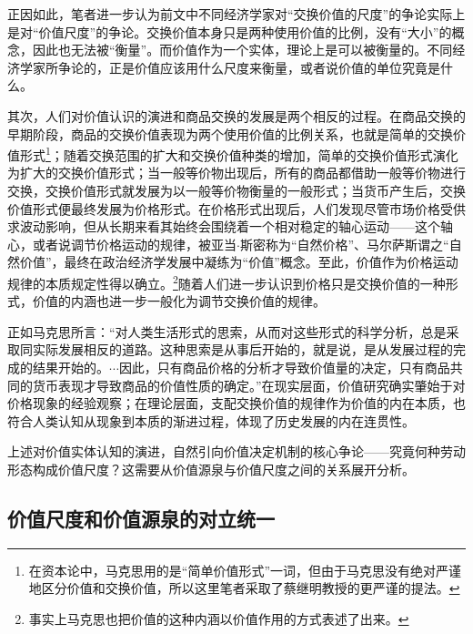 正因如此，笔者进一步认为前文中不同经济学家对“交换价值的尺度”的争论实际上是对“价值尺度”的争论。交换价值本身只是两种使用价值的比例，没有“大小”的概念，因此也无法被“衡量”。而价值作为一个实体，理论上是可以被衡量的。不同经济学家所争论的，正是价值应该用什么尺度来衡量，或者说价值的单位究竟是什么。

其次，人们对价值认识的演进和商品交换的发展是两个相反的过程。在商品交换的早期阶段，商品的交换价值表现为两个使用价值的比例关系\cite[49]{ZhongGongZhongYangMaKeSiEnGeSiLieNingSiDaLinZhuZuoBianYiJuMaKeSiEnGeSiWenJiDi5Juan2009}，也就是简单的交换价值形式\footnote{在资本论中，马克思用的是“简单价值形式”一词，但由于马克思没有绝对严谨地区分价值和交换价值\cite[37]{ZhongGongZhongYangMaKeSiEnGeSiLieNingSiDaLinZhuZuoBianYiJuMaKeSiEnGeSiWenJiDi8Juan2009}，所以这里笔者采取了蔡继明教授的更严谨的提法\cite[145]{CaiJiMingJieZhiZhengLunHuiGuYuZhanWang2008}。}；随着交换范围的扩大和交换价值种类的增加，简单的交换价值形式演化为扩大的交换价值形式；当一般等价物出现后，所有的商品都借助一般等价物进行交换，交换价值形式就发展为以一般等价物衡量的一般形式；当货币产生后，交换价值形式便最终发展为价格形式。在价格形式出现后，人们发现尽管市场价格受供求波动影响，但从长期来看其始终会围绕着一个相对稳定的轴心运动——这个轴心，或者说调节价格运动的规律，被亚当$\cdot$斯密称为“自然价格”、马尔萨斯谓之“自然价值”，最终在政治经济学发展中凝练为“价值”概念。至此，价值作为价格运动规律的本质规定性得以确立。\cite[145]{CaiJiMingJieZhiZhengLunHuiGuYuZhanWang2008}\footnote{事实上马克思也把价值的这种内涵以价值作用的方式表述了出来\cite[199]{ZhongGongZhongYangMaKeSiEnGeSiLieNingSiDaLinZhuZuoBianYiJuMaKeSiEnGeSiWenJiDi7Juan2009}。}随着人们进一步认识到价格只是交换价值的一种形式，价值的内涵也进一步一般化为调节交换价值的规律。

正如马克思所言：“对人类生活形式的思索，从而对这些形式的科学分析，总是采取同实际发展相反的道路。这种思索是从事后开始的，就是说，是从发展过程的完成的结果开始的。$\cdots$因此，只有商品价格的分析才导致价值量的决定，只有商品共同的货币表现才导致商品的价值性质的确定。”\cite[93]{ZhongGongZhongYangMaKeSiEnGeSiLieNingSiDaLinZhuZuoBianYiJuMaKeSiEnGeSiWenJiDi5Juan2009}在现实层面，价值研究确实肇始于对价格现象的经验观察；在理论层面，支配交换价值的规律作为价值的内在本质，也符合人类认知从现象到本质的渐进过程，体现了历史发展的内在连贯性。

上述对价值实体认知的演进，自然引向价值决定机制的核心争论——究竟何种劳动形态构成价值尺度？这需要从价值源泉与价值尺度之间的关系展开分析。

\subsection{价值尺度和价值源泉的对立统一}

